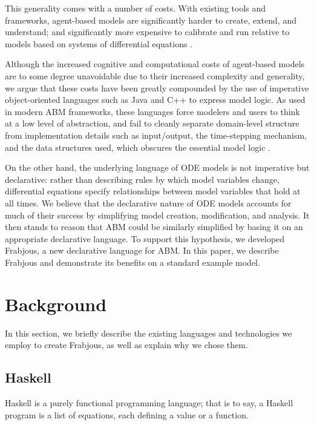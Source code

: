 \documentclass[oribibl]{llncs}
\begin{document}
  This generality comes with a number of costs. With existing tools and frameworks, agent-based models are significantly harder to create, extend, and understand; and significantly more expensive to calibrate and run relative to models based on systems of differential equations \cite{system_dyn_tradeoffs, ab_vs_de}. 
  
  Although the increased cognitive and computational costs of agent-based models are to some degree unavoidable due to their increased complexity and generality, we argue that these costs have been greatly compounded by the use of imperative object-oriented languages such as Java and C++ to express model logic. As used in modern ABM frameworks, these languages force modelers and users to think at a low level of abstraction, and fail to cleanly separate domain-level structure from implementation details such as input/output, the time-stepping mechanism, and the data structures used, which obscures the essential model logic \cite{system_dyn_tradeoffs}. 
  
  On the other hand, the underlying language of ODE models is not imperative but declarative: rather than describing rules by which model variables change, differential equations specify relationships between model variables that hold at all times. We believe that the declarative nature of ODE models accounts for much of their success by simplifying model creation, modification, and analysis. It then stands to reason that ABM could be similarly simplified by basing it on an appropriate declarative language. To support this hypothesis, we developed Frabjous, a new declarative language for ABM. In this paper, we describe Frabjous and demonstrate its benefits on a standard example model.
  
\section{Background}

In this section, we briefly describe the existing languages and technologies we employ to create Frabjous, as well as explain why we chose them.

\subsection{Haskell}

  Haskell is a purely functional programming language; that is to say, a Haskell program is a list of equations, each defining a value or a function.
  
\end{document}
